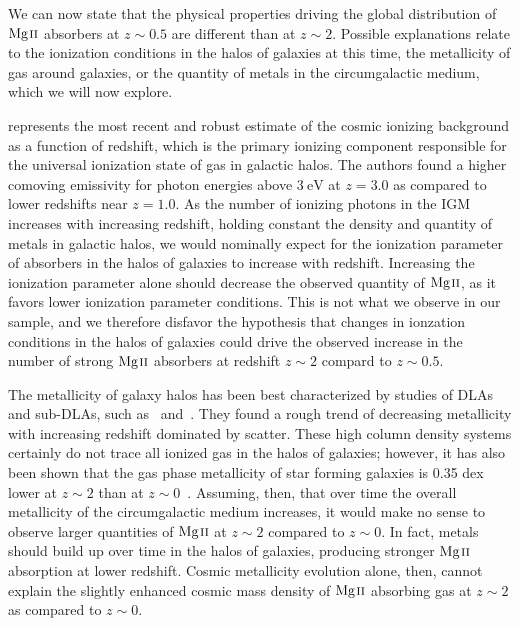 \documentclass[iop,apj,numberedappendix,appendixfloats,twocolappendix]{emulateapj}
\begin{document}
\noindent We can now state that the physical properties driving the global distribution of ${\hbox{{\rm Mg}\kern 0.1em{\sc ii}}}$ absorbers at $z \sim 0.5$ are different than at $z \sim 2$. Possible explanations relate to the ionization conditions in the halos of galaxies at this time, the metallicity of gas around galaxies, or the quantity of metals in the circumgalactic medium, which we will now explore.

\cite{Haardt2012} represents the most recent and robust estimate of the cosmic ionizing background as a function of redshift, which is the primary ionizing component responsible for the universal ionization state of gas in galactic halos. The authors found a higher comoving emissivity for photon energies above $3~\mathrm{eV}$ at $z = 3.0$ as compared to lower redshifts near $z = 1.0$. As the number of ionizing photons in the IGM increases with increasing redshift, holding constant the density and quantity of metals in galactic halos, we would nominally expect for the ionization parameter of absorbers in the halos of galaxies to increase with redshift. Increasing the ionization parameter alone should decrease the observed quantity of ${\hbox{{\rm Mg}\kern 0.1em{\sc ii}}}$, as it favors lower ionization parameter conditions. This is not what we observe in our sample, and we therefore disfavor the hypothesis that changes in ionzation conditions in the halos of galaxies could drive the observed increase in the number of strong ${\hbox{{\rm Mg}\kern 0.1em{\sc ii}}}$ absorbers at redshift $z \sim 2$ compard to $z \sim 0.5$. 

The metallicity of galaxy halos has been best characterized by studies of DLAs and sub-DLAs, such as~\cite{Rafelski2012} and~\cite{Quiret2016}. They found a rough trend of decreasing metallicity with increasing redshift dominated by scatter. These high column density systems certainly do not trace all ionized gas in the halos of galaxies; however, it has also been shown that the gas phase metallicity of star forming galaxies is 0.35 dex lower at $z \sim 2$ than at $z \sim 0$~\citep{Yuan2013}. Assuming, then, that over time the overall metallicity of the circumgalactic medium increases, it would make no sense to observe larger quantities of ${\hbox{{\rm Mg}\kern 0.1em{\sc ii}}}$ at $z \sim 2$ compared to $z \sim 0$. In fact, metals should build up over time in the halos of galaxies, producing stronger ${\hbox{{\rm Mg}\kern 0.1em{\sc ii}}}$ absorption at lower redshift. Cosmic metallicity evolution alone, then, cannot explain the slightly enhanced cosmic mass density of ${\hbox{{\rm Mg}\kern 0.1em{\sc ii}}}$ absorbing gas at $z \sim 2$ as compared to $z \sim 0$.
\end{document}
